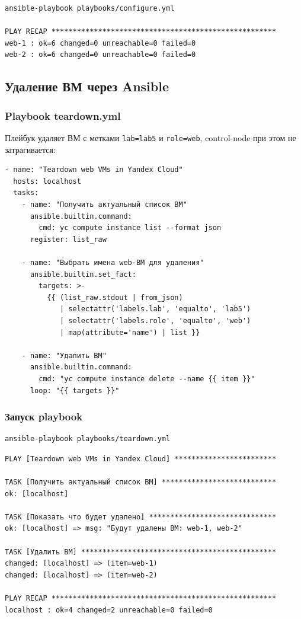 \documentclass[12pt,a4paper]{article}
\begin{document}
\begin{lstlisting}
ansible-playbook playbooks/configure.yml

PLAY RECAP *****************************************************
web-1 : ok=6 changed=0 unreachable=0 failed=0
web-2 : ok=6 changed=0 unreachable=0 failed=0
\end{lstlisting}

\subsection{Удаление ВМ через Ansible}

\subsubsection{Playbook teardown.yml}

Плейбук удаляет ВМ с метками \texttt{lab=lab5} и \texttt{role=web}, control-node при этом не затрагивается:

\begin{lstlisting}
- name: "Teardown web VMs in Yandex Cloud"
  hosts: localhost
  tasks:
    - name: "Получить актуальный список ВМ"
      ansible.builtin.command:
        cmd: yc compute instance list --format json
      register: list_raw

    - name: "Выбрать имена web-ВМ для удаления"
      ansible.builtin.set_fact:
        targets: >-
          {{ (list_raw.stdout | from_json)
             | selectattr('labels.lab', 'equalto', 'lab5')
             | selectattr('labels.role', 'equalto', 'web')
             | map(attribute='name') | list }}

    - name: "Удалить ВМ"
      ansible.builtin.command:
        cmd: "yc compute instance delete --name {{ item }}"
      loop: "{{ targets }}"
\end{lstlisting}

\subsubsection{Запуск playbook}

\begin{lstlisting}
ansible-playbook playbooks/teardown.yml
\end{lstlisting}

\begin{lstlisting}
PLAY [Teardown web VMs in Yandex Cloud] ************************

TASK [Получить актуальный список ВМ] ***************************
ok: [localhost]

TASK [Показать что будет удалено] ******************************
ok: [localhost] => msg: "Будут удалены ВМ: web-1, web-2"

TASK [Удалить ВМ] **********************************************
changed: [localhost] => (item=web-1)
changed: [localhost] => (item=web-2)

PLAY RECAP *****************************************************
localhost : ok=4 changed=2 unreachable=0 failed=0
\end{lstlisting}
\end{document}
